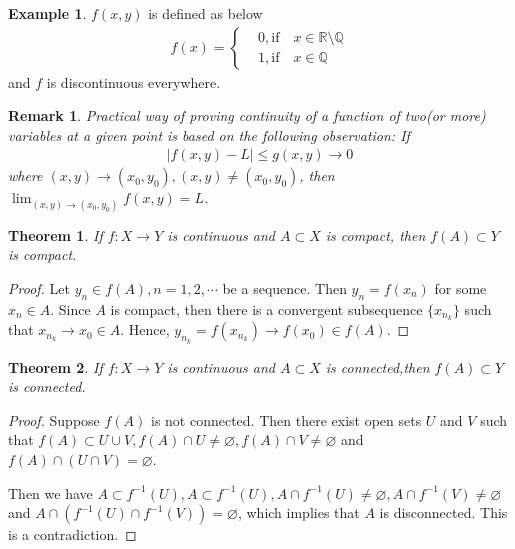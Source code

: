 \documentclass[12pt,leqno]{amsart}
\newtheorem{theorem}{Theorem}[section]
\newtheorem{remark}{Remark}[section]
\theoremstyle{definition}
\newtheorem{example}{Example}[section]
\numberwithin{equation}{subsection}
\begin{document}
\begin{example}
$f(x,y)$ is defined as below
\begin{align*}
    f(x) = \left\{
    \begin{aligned}
    & 0, \text{if} \quad x \in \mathbb{R}\setminus\mathbb{Q} \\
    & 1, \text{if} \quad x \in \mathbb{Q}
    \end{aligned}
    \right.
\end{align*}
and $f$ is discontinuous everywhere.
\end{example}

\begin{remark}
Practical way of proving continuity of a function of two(or more) variables at a given point is based on the following observation: If
\begin{align*}
    |f(x,y) - L| \leq g(x,y)\rightarrow 0
\end{align*}
where $(x,y)\to(x_0,y_0), (x,y)\neq(x_0,y_0)$, then $\lim_{(x,y)\to(x_0,y_0)}f(x,y) = L$.
\end{remark}

\medskip

\begin{theorem}
If $f:X\to Y$ is continuous and $A\subset X$ is compact, then $f(A)\subset Y$ is compact.
\end{theorem}
\begin{proof}
Let $y_n\in f(A), n = 1,2,\cdots$ be a sequence. Then $y_n = f(x_n)$ for some $x_n\in A$. Since $A$ is compact, then there is a convergent subsequence $\{x_{n_k}\}$ such that $x_{n_k}\to x_0\in A$. Hence, $y_{n_k} = f(x_{n_k})\to f(x_0) \in f(A)$.
\end{proof}

\begin{theorem}
If $f:X\to Y$ is continuous and $A\subset X$ is connected,then $f(A)\subset Y$ is connected.
\end{theorem}
\begin{proof}
Suppose $f(A)$ is not connected. Then there exist open sets $U$ and $V$ such that $f(A)\subset U\cup V, f(A)\cap U\neq\varnothing, f(A)\cap V\neq\varnothing$ and $f(A)\cap (U\cap V)=\varnothing$. 

Then we have $A\subset f^{-1}(U), A\subset f^{-1}(U), A \cap f^{-1}(U)\neq\varnothing, A \cap f^{-1}(V)\neq\varnothing$ and $A\cap (f^{-1}(U)\cap f^{-1}(V))=\varnothing$, which implies that $A$ is disconnected. This is a contradiction.
\end{proof}
\end{document}
